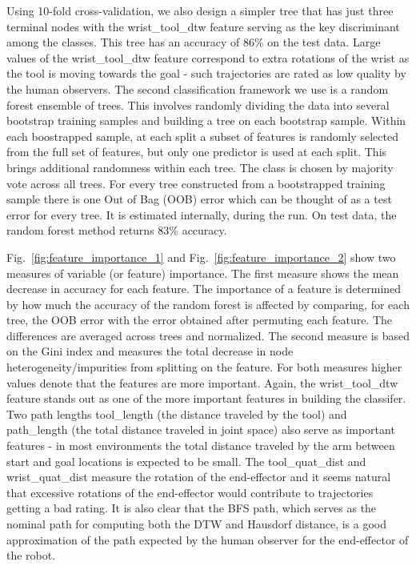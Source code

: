 \documentclass[letterpaper, 10 pt, conference]{ieeeconf}  %
\begin{document}
Using 10-fold cross-validation, we also design a simpler tree that has just three terminal nodes with the wrist\_tool\_dtw feature serving as the key discriminant among the classes. This tree has an accuracy of 86\% on the test data. Large values of the wrist\_tool\_dtw feature correspond to extra rotations of the wrist as the tool is moving towards the goal - such trajectories are rated as low quality by the human observers. 
The second classification framework we use is a random forest ensemble of trees. This involves randomly dividing the data into several bootstrap training samples and building a tree on each bootstrap sample. Within each boostrapped sample, at each split a subset of features is randomly selected from the full set of features, but only one predictor is used at each split. This brings additional randomness within each tree. The class is chosen by majority vote across all trees. For every tree constructed from a bootstrapped training sample there is one Out of Bag (OOB) error which can be thought of as a test error for every tree. It is estimated internally, during the run. On test data, the random forest method returns 83\% accuracy. 

Fig.~\ref{fig:feature_importance_1} and Fig.~\ref{fig:feature_importance_2} show two measures of variable (or feature) importance. The first measure shows the mean decrease in accuracy for each feature. The importance of a feature is determined by how much the accuracy of the random forest is affected by comparing, for each tree, the OOB error with the error obtained after permuting each feature. The differences are averaged across trees and normalized.  The second measure is based on the Gini index and measures the total decrease in node heterogeneity/impurities from splitting on the feature.  For both measures higher values denote that the features are more important. Again, the wrist\_tool\_dtw feature stands out as one of the more important features in building the classifer. Two path lengths tool\_length (the distance traveled by the tool) and path\_length (the total distance traveled in joint space) also serve as important features - in most environments the total distance traveled by the arm between start and goal locations is expected to be small. The tool\_quat\_dist and wrist\_quat\_dist measure the rotation of the end-effector and it seems natural that excessive rotations of the end-effector would contribute to trajectories getting a bad rating. It is also clear that the BFS path, which serves as the nominal path for computing both the DTW and Hausdorf distance, is a good approximation of the path expected by the human observer for the end-effector of the robot. 
\end{document}
